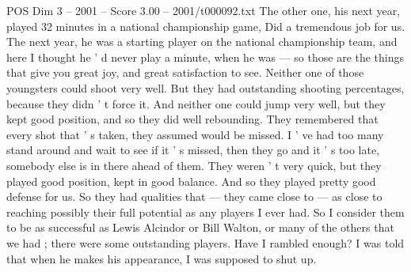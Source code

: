 \begin{textsample}{POS Dim 3 – 2001 – Score 3.00 – 2001/t000092.txt}
The other one, his next year, played 32 minutes in a national championship game, Did a tremendous job for us.
The next year, he was a starting player on the national championship team, and here I thought he ' d never play a minute, when he was — so those are the things that give you great joy, and great satisfaction to see.
Neither one of those youngsters could shoot very well.
But they had outstanding shooting percentages, because they didn ' t force it.
And neither one could jump very well, but they kept good position, and so they did well rebounding.
They remembered that every shot that ' s taken, they assumed would be missed.
I ' ve had too many stand around and wait to see if it ' s missed, then they go and it ' s too late, somebody else is in there ahead of them.
They weren ' t very quick, but they played good position, kept in good balance.
And so they played pretty good defense for us.
So they had qualities that — they came close to — as close to reaching possibly their full potential as any players I ever had.
So I consider them to be as successful as Lewis Alcindor or Bill Walton, or many of the others that we had ; there were some outstanding players.
Have I rambled enough?
I was told that when he makes his appearance, I was supposed to shut up.

\end{textsample}
